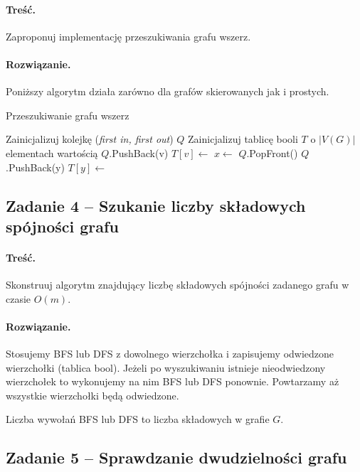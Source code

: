 \paragraph{Treść.} Zaproponuj implementację
przeszukiwania grafu wszerz.

\paragraph{Rozwiązanie.}
Poniższy algorytm działa zarówno dla grafów skierowanych
jak i prostych.

\begin{algorithm}[H]
	\caption{Przeszukiwanie grafu wszerz}\label{Zadanie23}
	\begin{algorithmic}[1]
		\State Zainicjalizuj kolejkę (\textit{first in, first out}) $Q$
		\State Zainicjalizuj tablicę booli $T$ o $|V(G)|$ elementach wartością 
		\false
		\State $Q$.PushBack(v)
		\State $T[v] \gets$ \false
		\State $x \gets$ $Q$.PopFront()
		\State $Q$.PushBack(y)
		\State $T[y] \gets$ \true
		\EndIf
		\EndWhile
		\EndWhile
		\EndProcedure
	\end{algorithmic}
\end{algorithm}

\subsection{Zadanie 4 -- Szukanie liczby składowych spójności grafu}
\paragraph{Treść.} Skonstruuj algorytm znajdujący liczbę składowych 
spójności zadanego grafu w czasie $O(m)$.

\paragraph{Rozwiązanie.} Stosujemy BFS lub DFS z dowolnego 
wierzchołka i zapisujemy odwiedzone wierzchołki (tablica bool).
Jeżeli po wyszukiwaniu istnieje nieodwiedzony wierzchołek to 
wykonujemy na nim BFS lub DFS ponownie. Powtarzamy aż
wszystkie wierzchołki będą odwiedzone. 

Liczba wywołań BFS lub DFS to liczba składowych w grafie $G$.

\subsection{Zadanie 5 -- Sprawdzanie dwudzielności grafu}
\label{exc:bipart}
